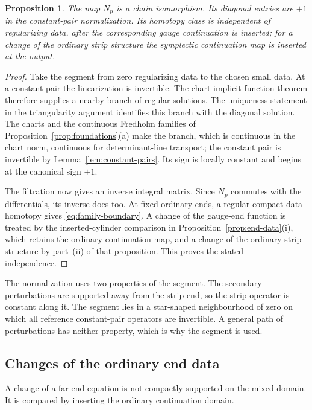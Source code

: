 \documentclass[11pt]{amsart}
\newtheorem{proposition}[theorem]{Proposition}
\theoremstyle{definition}
\theoremstyle{remark}
\theoremstyle{plain}
\numberwithin{equation}{section}
\begin{document}
\begin{proposition}\label{prop:N-isomorphism}
The map $N_p$ is a chain isomorphism. Its diagonal entries
are $+1$ in the constant-pair normalization. Its homotopy
class is independent of regularizing data, after the
corresponding gauge continuation is inserted; for a change of the
ordinary strip structure the symplectic continuation map is inserted
at the output.
\end{proposition}
\begin{proof}
Take the segment from zero regularizing data to the
chosen small data. At a constant pair the linearization
is invertible. The chart implicit-function theorem
therefore supplies a nearby branch of regular solutions.
The uniqueness statement in the triangularity argument
identifies this branch with the diagonal solution. The charts and
the continuous Fredholm families of
Proposition~\ref{prop:foundations}(a) make the branch, which is
continuous in the chart norm, continuous for determinant-line
transport; the constant pair is invertible by
Lemma~\ref{lem:constant-pairs}. Its sign is locally
constant and begins at the canonical sign $+1$.

The filtration now gives an inverse integral matrix.
Since $N_p$ commutes with the differentials, its inverse
does too. At fixed ordinary ends, a regular compact-data homotopy gives
\eqref{eq:family-boundary}. A change of the gauge-end function
is treated by the inserted-cylinder comparison in
Proposition~\ref{prop:end-data}(i), which retains the ordinary
continuation map, and a change of the ordinary strip structure by
part~(ii) of that proposition. This proves the stated independence.
\end{proof}

The normalization uses two properties of the segment. The secondary
perturbations are supported away from the strip end, so the strip
operator is constant along it. The segment lies in a star-shaped
neighbourhood of zero on which all reference constant-pair operators
are invertible. A general path of perturbations has neither property,
which is why the segment is used.

\subsection{Changes of the ordinary end data}
\label{subsec:end-data}
A change of a far-end equation is not compactly supported on the
mixed domain. It is compared by inserting the ordinary continuation
domain.
\end{document}
